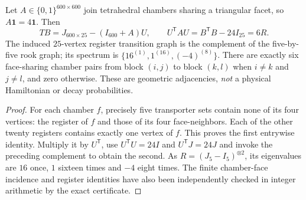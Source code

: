 \documentclass[11pt]{article}
\begin{document}
\begin{theorem}
\label{p1:thm:v366-face-register-identity}
Let $A\in\{0,1\}^{600\times600}$ join tetrahedral chambers
sharing a triangular facet, so $A\mathbf1=4\mathbf1$.  Then
\begin{equation}\label{p1:eq:v366-face-identity}
 \boxed{TB=J_{600\times25}-(I_{600}+A)U},\qquad
 \boxed{U^{\mathsf T}AU=B^{\mathsf T}B-24I_{25}=6R}.
\end{equation}
The induced $25$-vertex register transition graph is the complement
of the five-by-five rook graph; its spectrum is
$\{16^{(1)},1^{(16)},(-4)^{(8)}\}$.  There are exactly six
face-sharing chamber pairs from block $(i,j)$ to block $(k,l)$
when $i\ne k$ and $j\ne l$, and zero otherwise.  These are geometric
adjacencies, \emph{not} a physical Hamiltonian or decay probabilities.
\end{theorem}
\begin{proof}
For each chamber $f$, precisely five transporter sets contain none
of its four vertices: the register of $f$ and those of its four
face-neighbors.  Each of the other twenty registers contains exactly
one vertex of $f$.  This proves the first entrywise identity.  Multiply
it by $U^{\mathsf T}$, use $U^{\mathsf T}U=24I$ and
$U^{\mathsf T}J=24J$ and invoke the preceding complement to obtain
the second.  As $R=(J_5-I_5)^{\otimes2}$, its eigenvalues are
$16$ once, $1$ sixteen times and $-4$ eight times.  The finite
chamber-face incidence and register identities have also been
independently checked in integer arithmetic by the exact certificate.
\end{proof}
\end{document}
